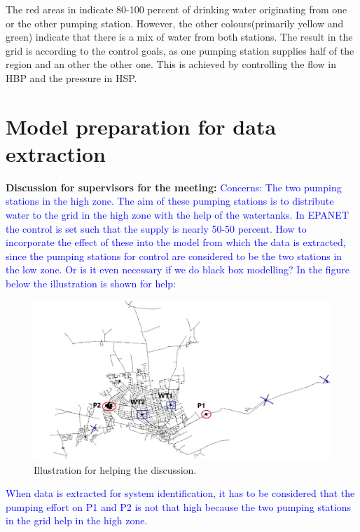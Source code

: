 The red areas in  indicate 80-100 percent of drinking water originating from one or the other pumping station. However, the other colours(primarily yellow and green) indicate that there is a mix of water from both stations. The result in the grid is according to the control goals, as one pumping station supplies half of the region and an other the other one. This is achieved by controlling the flow in HBP and the pressure in HSP. 

\section{Model preparation for data extraction}
\label{model_preparation_for_data_extraction}

\textbf{Discussion for supervisors for the meeting:}
\newline
\textcolor{blue}{Concerns: The two pumping stations in the high zone. The aim of these pumping stations is to distribute water to the grid in the high zone with the help of the watertanks. In EPANET the control is set such that the supply is nearly 50-50 percent. How to incorporate the effect of these into the model from which the data is extracted, since the pumping stations for control are considered to be the two stations in the low zone. Or is it even necessary if we do black box modelling? In the figure below the illustration is shown for help: }

\begin{figure}[H]
\centering
\includegraphics[width=1.2\textwidth]{report/pictures/supervisors}
% 
\caption{Illustration for helping the discussion.}
\label{fig:PRV_EPANET}
\end{figure}

\textcolor{blue}{When data is extracted for system identification, it has to be considered that the pumping effort on P1 and P2 is not that high because the two pumping stations in the grid help in the high zone. }



















